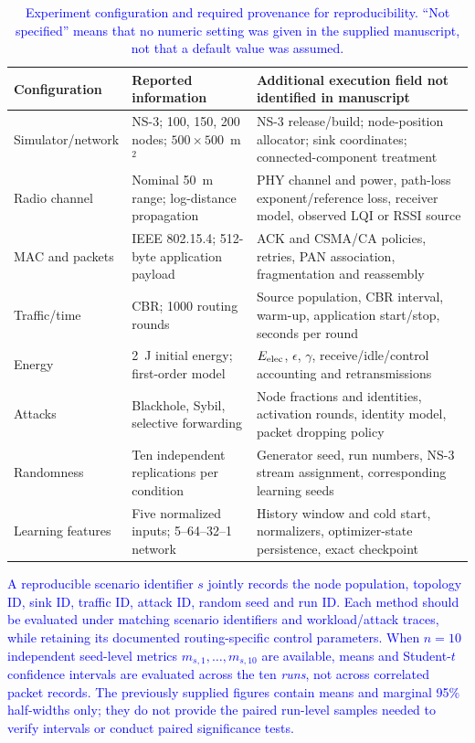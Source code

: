 \documentclass[pdflatex,sn-mathphys-num]{sn-jnl}
\newcommand{\Revised}[1]{\textcolor{blue}{#1}}
\begin{document}
\begin{table}[ht]
\centering\small
\caption{\Revised{Experiment configuration and required provenance for reproducibility. ``Not specified'' means that no numeric setting was given in the supplied manuscript, not that a default value was assumed.}}
\label{tab:scenario_contract_final}
\begin{tabular}{p{}p{}p{}}
\toprule
\textbf{Configuration} & \textbf{Reported information} & \textbf{Additional execution field not identified in manuscript}\\
\midrule
Simulator/network & NS-3; 100, 150, 200 nodes; $500\times500$~m$^2$ & NS-3 release/build; node-position allocator; sink coordinates; connected-component treatment\\
Radio channel & Nominal 50~m range; log-distance propagation & PHY channel and power, path-loss exponent/reference loss, receiver model, observed LQI or RSSI source\\
MAC and packets & IEEE 802.15.4; 512-byte application payload & ACK and CSMA/CA policies, retries, PAN association, fragmentation and reassembly\\
Traffic/time & CBR; 1000 routing rounds & Source population, CBR interval, warm-up, application start/stop, seconds per round\\
Energy & 2~J initial energy; first-order model & $E_{\rm elec}$, $\epsilon$, $\gamma$, receive/idle/control accounting and retransmissions\\
Attacks & Blackhole, Sybil, selective forwarding & Node fractions and identities, activation rounds, identity model, packet dropping policy\\
Randomness & Ten independent replications per condition & Generator seed, run numbers, NS-3 stream assignment, corresponding learning seeds\\
Learning features & Five normalized inputs; 5--64--32--1 network & History window and cold start, normalizers, optimizer-state persistence, exact checkpoint\\
\bottomrule
\end{tabular}
\end{table}

\Revised{A reproducible scenario identifier $s$ jointly records the node population, topology ID, sink ID, traffic ID, attack ID, random seed and run ID. Each method should be evaluated under matching scenario identifiers and workload/attack traces, while retaining its documented routing-specific control parameters. When $n=10$ independent seed-level metrics $m_{s,1},\ldots,m_{s,10}$ are available, means and Student-$t$ confidence intervals are evaluated across the ten \emph{runs}, not across correlated packet records. The previously supplied figures contain means and marginal 95\% half-widths only; they do not provide the paired run-level samples needed to verify intervals or conduct paired significance tests.}
\end{document}
